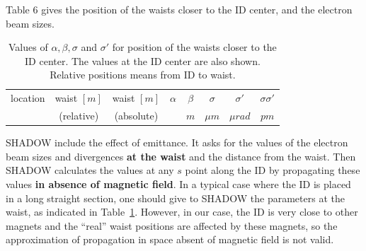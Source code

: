 \documentclass[a4paper,10pt]{article}
\begin{document}
Table 6 gives the position of the waists closer to the ID center, and the electron beam sizes. 
% 
\begin{table}[H]
\label{tablewaist}
\caption{Values of $\alpha, \beta, \sigma$ and $\sigma'$ for position of the waists closer to the ID center. The values at the ID center 
are also shown. Relative positions means from ID to waist.
} 
\vspace{0.3cm}
\begin{tabular}{cccccccc}
\hline
location & waist $[m]$ &  waist $[m]$ &  $\alpha$    & $\beta$    & $\sigma$   & $\sigma'$ & $\sigma \sigma'$\\
         & (relative)  &  (absolute)  &              & $m$        & $\mu m$    & $\mu rad$ &     $pm$        \\
\hline

\hline     
\end{tabular}
\end{table}
% 

SHADOW include the effect of emittance. It asks for the values of the electron beam sizes and divergences {\bf at the waist} and the distance
from the waist. Then SHADOW calculates the values at any $s$ point along the ID by propagating these values {\bf in absence of magnetic field}.
In a typical case where the ID is placed in a long straight section, one should give to SHADOW the parameters at the waist, as indicated in 
Table~\ref{tablewaist}. However, in our case, the ID is very close to other magnets and the ``real'' waist positions are affected by these magnets, 
so the approximation of propagation in space absent of magnetic field is not valid. 
\end{document}
